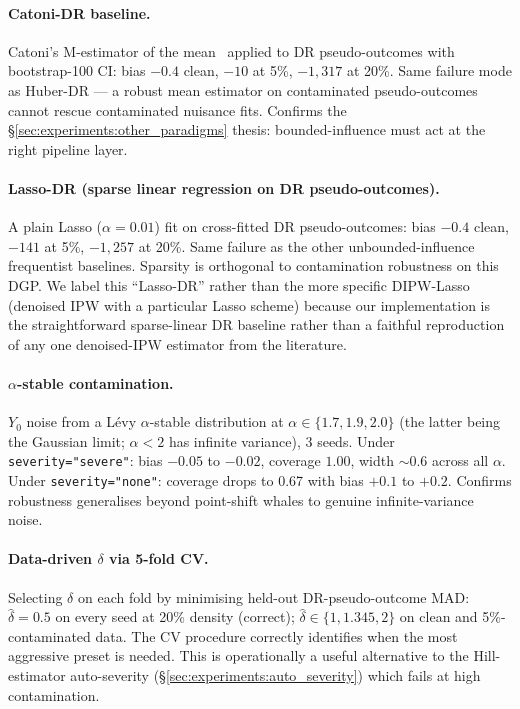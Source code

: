 \paragraph{Catoni-DR baseline.}
Catoni's M-estimator of the mean~\citep{catoni2012challenging}
applied to DR pseudo-outcomes with bootstrap-100 CI: bias $-0.4$
clean, $-10$ at 5\%, $-1{,}317$ at 20\%. Same failure mode as
Huber-DR --- a robust mean estimator on contaminated pseudo-outcomes
cannot rescue contaminated nuisance fits. Confirms the
\S\ref{sec:experiments:other_paradigms} thesis: bounded-influence
must act at the right pipeline layer.

\paragraph{Lasso-DR (sparse linear regression on DR pseudo-outcomes).}
A plain Lasso ($\alpha = 0.01$) fit on cross-fitted DR pseudo-outcomes:
bias $-0.4$ clean, $-141$ at 5\%, $-1{,}257$ at 20\%. Same failure as
the other unbounded-influence frequentist baselines. Sparsity is
orthogonal to contamination robustness on this DGP. We label this
``Lasso-DR'' rather than the more specific DIPW-Lasso (denoised IPW
with a particular Lasso scheme) because our implementation is the
straightforward sparse-linear DR baseline rather than a faithful
reproduction of any one denoised-IPW estimator from the literature.

\paragraph{$\alpha$-stable contamination.}
$Y_0$ noise from a L\'evy $\alpha$-stable distribution at
$\alpha \in \{1.7, 1.9, 2.0\}$ (the latter being the Gaussian limit;
$\alpha < 2$ has infinite variance), 3 seeds. Under
\texttt{severity="severe"}: bias $-0.05$ to $-0.02$, coverage $1.00$,
width $\sim 0.6$ across all $\alpha$. Under \texttt{severity="none"}:
coverage drops to 0.67 with bias $+0.1$ to $+0.2$. Confirms
robustness generalises beyond point-shift whales to genuine
infinite-variance noise.

\paragraph{Data-driven $\delta$ via 5-fold CV.}
Selecting $\delta$ on each fold by minimising held-out DR-pseudo-outcome
MAD: $\hat\delta = 0.5$ on every seed at 20\% density (correct);
$\hat\delta \in \{1, 1.345, 2\}$ on clean and 5\%-contaminated data.
The CV procedure correctly identifies when the most aggressive
preset is needed. This is operationally a useful alternative to
the Hill-estimator auto-severity (\S\ref{sec:experiments:auto_severity})
which fails at high contamination.

